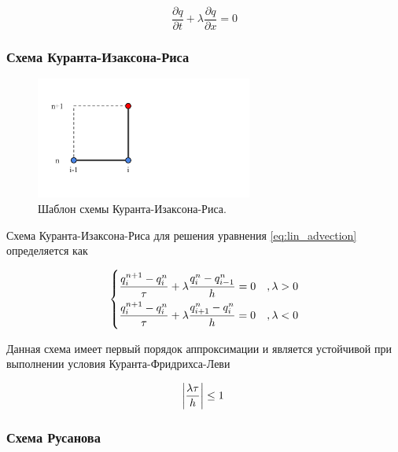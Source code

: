 \begin{equation*}
    \dfrac{\partial q}{\partial t} + \lambda \dfrac{\partial q}{\partial x} = 0
    \label{eq:lin_advection}
\end{equation*}
    
\subsubsection{Схема Куранта-Изаксона-Риса}

\begin{figure}[htb]
    \centering
    \includegraphics[trim={55pt 100pt 530pt 100pt},clip,height=4cm]{images/theory/scheme_cir.png}
    \caption{Шаблон схемы Куранта-Изаксона-Риса.}
    \label{fig:scheme_cir}
\end{figure}

Схема Куранта-Изаксона-Риса для решения уравнения \eqref{eq:lin_advection} определяется как

\begin{equation*}
\begin{dcases}
    \dfrac{q_i^{n+1} - q_i^n}{\tau} + \lambda\dfrac{q_i^n - q_{i-1}^n}{h} = 0 & , \lambda > 0\\
    \dfrac{q_i^{n+1} - q_i^n}{\tau} + \lambda\dfrac{q_{i+1}^n - q_i^n}{h} = 0  & , \lambda < 0
\end{dcases}
\end{equation*}

Данная схема имеет первый порядок аппроксимации и является устойчивой при выполнении условия Куранта-Фридрихса-Леви

\begin{equation}
    \abs{\dfrac{\lambda \tau}{h}} \leq 1
    \label{eq:cfl_condition}
\end{equation}

\subsubsection{Схема Русанова}

